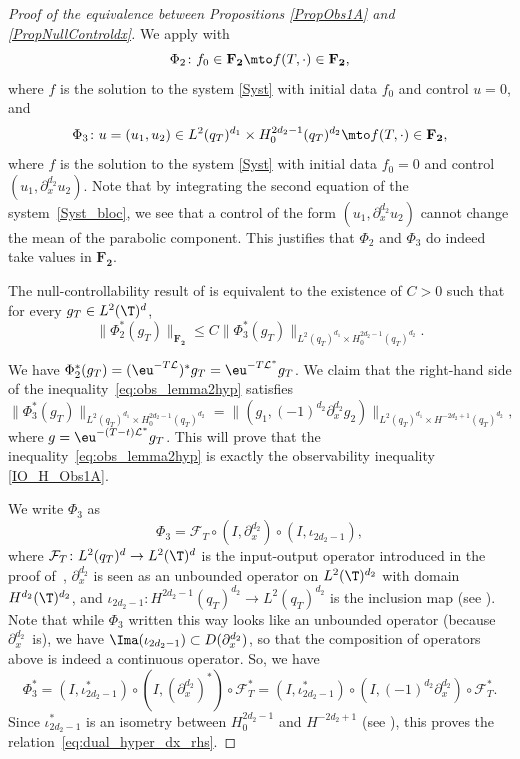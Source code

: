 \begin{proof}[Proof of the equivalence between Propositions \ref{PropObs1A} and \ref{PropNullControldx}]
We apply  with
\[
\Phi_2 \colon f_0 \in \mathbf{F_2} \mto f(T,\cdot) \in \mathbf{F_2},
\]
where $f$ is the solution to the system \eqref{Syst} with initial data $f_0$ and control $u=0$, and
\[
\Phi_3 \colon u=(u_1,u_2) \in L^2(q_T)^{d_1} \times H_0^{2d_2-1}(q_T)^{d_2} \mto f(T,\cdot) \in \mathbf{F_2},
\]
where $f$ is the solution to the system \eqref{Syst} with initial data $f_0=0$ and control $(u_1,\partial_x^{d_2} u_2)$. Note that by integrating the second equation of the system~\eqref{Syst_bloc}, we see that a control of the form $(u_1,\partial_x^{d_2}u_2)$ cannot change the mean of the parabolic component. This justifies that $\Phi_2$ and $\Phi_3$ do indeed take values in $\mathbf{F_2}$.

The null-controllability result of  is equivalent to the existence of $C>0$ such that for every $g_T\in L^2(\T)^d$,
\begin{equation}\label{eq:obs_lemma2hyp}
\lVert\Phi_2^*(g_T)\rVert_{\mathbf{F_2}}\leq C\lVert \Phi_3^*(g_T)\rVert_{L^2(q_T)^{d_1}\times H^{2d_2-1}_0(q_T)^{d_2}}.
\end{equation}

We have $\Phi_2^*(g_T) = (\eu^{-T\mathcal L})^* g_T = \eu^{-T\mathcal L^*}g_T$. We claim that the right-hand side of the inequality~\eqref{eq:obs_lemma2hyp} satisfies
\begin{equation}\label{eq:dual_hyper_dx_rhs}
\lVert\Phi_3^*(g_T)\rVert_{L^2(q_T)^{d_1}\times H^{2d_2-1}_0(q_T)^{d_2}} = \lVert (g_1, (-1)^{d_2}\partial_{x}^{d_2} g_2) \rVert_{L^2(q_T)^{d_1}\times H^{-2d_2+1}(q_T)^{d_2}},
\end{equation}
where $g = \eu^{-(T-t)\mathcal L^*}g_T$. This will prove that the inequality~\eqref{eq:obs_lemma2hyp} is exactly the observability inequality \eqref{IO_H_Obs1A}.

We write $\Phi_3$ as
\[
\Phi_3 = \mathcal F_T \circ (I, \partial_x^{d_2}) \circ (I,\iota_{2d_2-1}),
\]
where $\mathcal F_T\colon L^2(q_T)^d \to L^2(\T)^d$ is the input-output operator introduced in
the proof of~, $\partial_x^{d_2}$ is seen as an unbounded operator on
$L^2(\T)^{d_2}$ with domain $H^{d_2}(\T)^{d_2}$, and $\iota_{2d_2-1}\colon
H^{2d_2-1}(q_T)^{d_2}\to L^2(q_T)^{d_2}$ is the inclusion map (see ).
Note that while $\Phi_3$ written this way looks like an unbounded operator (because
$\partial_x^{d_2}$~is), we have $\Ima(\iota_{2d_2-1})\subset D(\partial_x^{d_2})$, so that the
composition of operators above is indeed a continuous operator. So, we have
\[
\Phi_3^* = (I,\iota_{2d_2-1}^*)\circ(I, (\partial_x^{d_2})^*) \circ \mathcal F_T^* =(I,\iota_{2d_2-1}^*)\circ(I,(-1)^{d_2} \partial_x^{d_2}) \circ \mathcal F_T^*.
\]
Since $\iota_{2d_2-1}^*$ is an isometry between $H^{2d_2-1}_0$ and $H^{-2d_2+1}$ (see ), this proves the relation~\eqref{eq:dual_hyper_dx_rhs}.
\end{proof}

